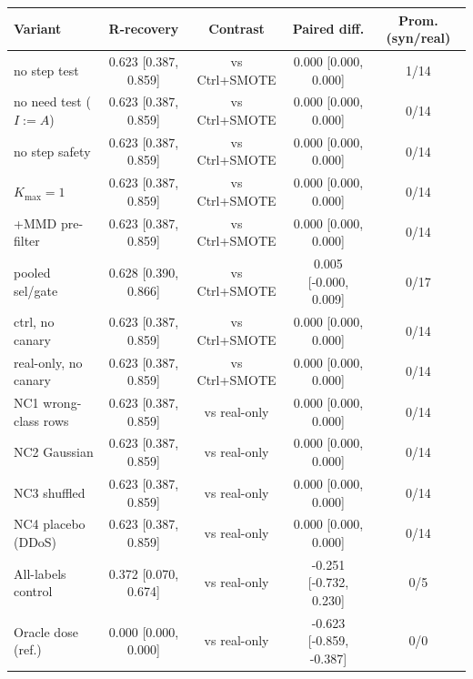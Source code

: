 \begin{tabular}{lcccc}
\toprule
Variant & R-recovery & Contrast & Paired diff. & Prom. (syn/real) \\
\midrule
no step test & 0.623 [0.387, 0.859] & vs Ctrl+SMOTE & 0.000 [0.000, 0.000] & 1/14 \\
no need test ($I{:=}A$) & 0.623 [0.387, 0.859] & vs Ctrl+SMOTE & 0.000 [0.000, 0.000] & 0/14 \\
no step safety & 0.623 [0.387, 0.859] & vs Ctrl+SMOTE & 0.000 [0.000, 0.000] & 0/14 \\
$K_{\max}{=}1$ & 0.623 [0.387, 0.859] & vs Ctrl+SMOTE & 0.000 [0.000, 0.000] & 0/14 \\
+MMD pre-filter & 0.623 [0.387, 0.859] & vs Ctrl+SMOTE & 0.000 [0.000, 0.000] & 0/14 \\
pooled sel/gate & 0.628 [0.390, 0.866] & vs Ctrl+SMOTE & 0.005 [-0.000, 0.009] & 0/17 \\
ctrl, no canary & 0.623 [0.387, 0.859] & vs Ctrl+SMOTE & 0.000 [0.000, 0.000] & 0/14 \\
real-only, no canary & 0.623 [0.387, 0.859] & vs Ctrl+SMOTE & 0.000 [0.000, 0.000] & 0/14 \\
NC1 wrong-class rows & 0.623 [0.387, 0.859] & vs real-only & 0.000 [0.000, 0.000] & 0/14 \\
NC2 Gaussian & 0.623 [0.387, 0.859] & vs real-only & 0.000 [0.000, 0.000] & 0/14 \\
NC3 shuffled & 0.623 [0.387, 0.859] & vs real-only & 0.000 [0.000, 0.000] & 0/14 \\
NC4 placebo (DDoS) & 0.623 [0.387, 0.859] & vs real-only & 0.000 [0.000, 0.000] & 0/14 \\
All-labels control & 0.372 [0.070, 0.674] & vs real-only & -0.251 [-0.732, 0.230] & 0/5 \\
Oracle dose (ref.) & 0.000 [0.000, 0.000] & vs real-only & -0.623 [-0.859, -0.387] & 0/0 \\
\bottomrule
\end{tabular}
